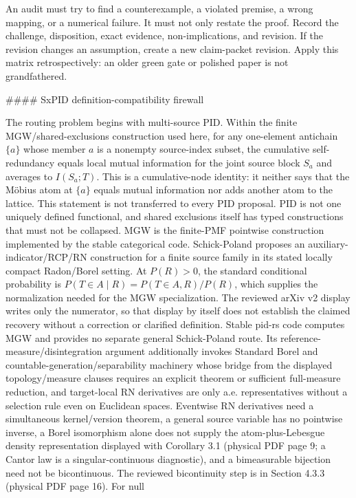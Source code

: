 \documentclass[11pt]{article}
\begin{document}
\begin{markdown}
An audit must try to find a counterexample, a violated premise, a wrong mapping, or a numerical
failure. It must not only restate the proof. Record the challenge, disposition, exact evidence,
non-implications, and revision. If the revision changes an assumption, create a new claim-packet
revision. Apply this matrix retrospectively: an older green gate or polished paper is not
grandfathered.

#### SxPID definition-compatibility firewall

The routing problem begins with multi-source PID. Within the finite MGW/shared-exclusions
construction used here, for any one-element antichain $\{a\}$ whose member $a$ is a nonempty
source-index subset, the cumulative self-redundancy equals local mutual information for the joint
source block $S_a$ and averages to $I(S_a;T)$. This is a cumulative-node identity: it neither says
that the Möbius atom at $\{a\}$ equals mutual information nor adds another atom to the lattice. This
statement is not transferred to every PID proposal. PID is not one uniquely defined functional,
and shared exclusions itself has typed constructions
that must not be collapsed. MGW is the finite-PMF pointwise construction implemented by the stable
categorical code. Schick-Poland proposes an auxiliary-indicator/RCP/RN construction for a finite
source family in its stated locally compact Radon/Borel setting. At $P(R)>0$, the standard
conditional probability is $P(T\in A\mid R)=P(T\in A,R)/P(R)$, which supplies the normalization
needed for the MGW specialization. The reviewed arXiv v2 display writes only the numerator, so that
display by itself does not establish the claimed recovery without a correction or clarified
definition. Stable pid-rs code computes MGW and provides no separate general Schick-Poland route. Its
reference-measure/disintegration argument additionally invokes
Standard Borel and countable-generation/separability machinery whose bridge from the displayed
topology/measure clauses requires an explicit theorem or sufficient full-measure reduction, and
target-local RN derivatives are only a.e. representatives without a selection rule even on
Euclidean spaces. Eventwise RN derivatives need a simultaneous kernel/version theorem, a general
source variable has no pointwise inverse, a Borel isomorphism alone does not supply the
atom-plus-Lebesgue density representation displayed with Corollary 3.1 (physical PDF page 9; a
Cantor law is a singular-continuous diagnostic), and a bimeasurable bijection need not be
bicontinuous. The reviewed bicontinuity step is in Section 4.3.3 (physical PDF page 16). For null

\end{markdown}
\end{document}
